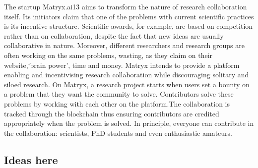 \documentclass[runningheads]{llncs}
\begin{document}
The startup Matryx.ai13 aims to transform the nature of research collaboration itself. Its initiators claim that one of the problems with current scientific practices is its incentive structure. Scientific awards, for example, are based on competition rather than on collaboration, despite the fact that new ideas are usually collaborative in nature. Moreover, different researchers and research groups are often working on the same problems, wasting, as they claim on their website,‘brain power’, time and money. Matryx intends to provide a platform enabling and incentivising research collaboration while discouraging solitary and siloed research. On Matryx, a research project starts when users set a bounty on a problem that they want the community to solve. Contributors solve these problems by working with each other on the platform.The collaboration is tracked through the blockchain thus ensuring contributors are credited appropriately when the problem is solved. In principle, everyone can contribute in the collaboration: scientists, PhD students and even enthusiastic amateurs.


\subsection{Ideas here}
\end{document}
